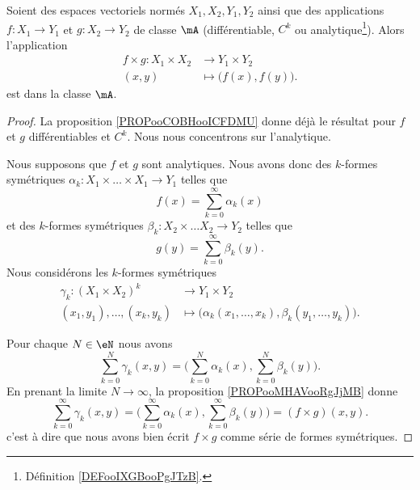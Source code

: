 \begin{proposition}	\label{PROPooPESTooQmWGRJ}
	Soient des espaces vectoriels normés \( X_1, X_2,Y_1,Y_2\) ainsi que des applications \(f \colon X_1\to Y_1  \) et \(g \colon X_2\to Y_2  \) de classe \( \mA\) (différentiable, \( C^k\) ou analytique\footnote{Définition \ref{DEFooIXGBooPgJTzB}.}). Alors l'application
	\begin{equation}
		\begin{aligned}
			f\times g\colon X_1\times X_2 & \to Y_1\times Y_2               \\
			(x,y)                         & \mapsto \big( f(x), f(y) \big).
		\end{aligned}
	\end{equation}
	est dans la classe \( \mA\).
\end{proposition}

\begin{proof}

	La proposition \ref{PROPooCOBHooICFDMU} donne déjà le résultat pour \( f\) et \( g\) différentiables et \( C^k\). Nous nous concentrons sur l'analytique.

	Nous supposons que \( f\) et \( g\) sont analytiques. Nous avons donc des \( k\)-formes symétriques \(\alpha_k \colon X_1\times\ldots\times X_1\to Y_1  \) telles que
	\begin{equation}
		f(x)=\sum_{k=0}^{\infty}\alpha_k(x)
	\end{equation}
	et des \( k\)-formes symétriques \(\beta_k \colon X_2\times \ldots X_2\to Y_2  \) telles que
	\begin{equation}
		g(y)=\sum_{k=0}^{\infty}\beta_k(y).
	\end{equation}
	Nous considérons les \( k\)-formes symétriques
	\begin{equation}
		\begin{aligned}
			\gamma_k\colon (X_1\times X_2)^k & \to Y_1\times Y_2                                                     \\
			(x_1,y_1),\ldots,(x_k,y_k)       & \mapsto \big( \alpha_k(x_1,\ldots,x_k),\beta_k(y_1,\ldots,y_k) \big).
		\end{aligned}
	\end{equation}

	Pour chaque \( N\in \eN\) nous avons
	\begin{equation}
		\sum_{k=0}^N\gamma_k(x,y)=\big( \sum_{k=0}^N\alpha_k(x),\sum_{k=0}^N\beta_k(y) \big).
	\end{equation}
	En prenant la limite \( N\to \infty\), la proposition \ref{PROPooMHAVooRgJjMB} donne
	\begin{equation}
		\sum_{k=0}^{\infty}\gamma_k(x,y)=\big( \sum_{k=0}^{\infty}\alpha_k(x),\sum_{k=0}^{\infty}\beta_k(y) \big)=(f\times g)(x,y).
	\end{equation}
	c'est à dire que nous avons bien écrit \( f\times g\) comme série de formes symétriques.
\end{proof}


